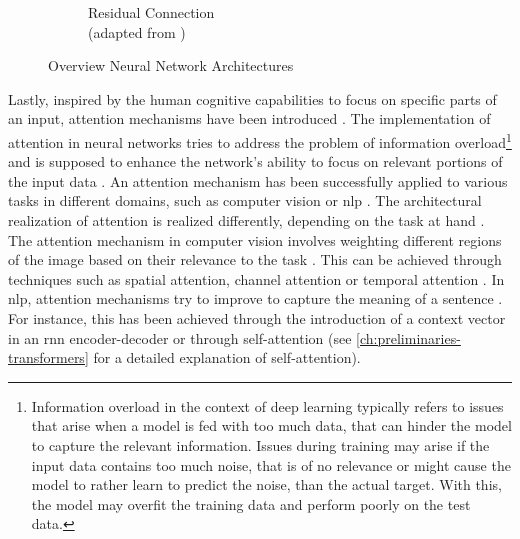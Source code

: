 \begin{figure}
\begin{subfigure}{0.7\textwidth}
        \captionsetup{justification=centering}
        \caption{Residual Connection \\(adapted from \cite{hassan2019ResNet3450})} \label{fig:resnet}
      \end{subfigure}%
    \hspace*{\fill}   %
  \caption[Overview Neural Network Architectures]{Overview Neural Network Architectures} \label{fig:NN_architectures_Overview}
\end{figure}

Lastly, inspired by the human cognitive capabilities to focus on specific parts of an input, attention mechanisms have been introduced \cite{niu2021ReviewAttentionMechanism, aggarwal2018NeuralNetworksDeep}.
The implementation of attention in neural networks tries to address the problem of information overload\footnote{Information overload in the context of deep learning typically refers to issues that arise when a model is fed with too much data, that can hinder the model to capture the relevant information.
Issues during training may arise if the input data contains too much noise, that is of no relevance or might cause the model to rather learn to predict the noise, than the actual target.
With this, the model may overfit the training data and perform poorly on the test data. } and is supposed to enhance the network's ability to focus on relevant portions of the input data \cite{niu2021ReviewAttentionMechanism}.
An attention mechanism has been successfully applied to various tasks in different domains, such as computer vision or \gls{nlp} \cite{niu2021ReviewAttentionMechanism}.
The architectural realization of attention is realized differently, depending on the task at hand \cite{aggarwal2018NeuralNetworksDeep}.
The attention mechanism in computer vision involves weighting different regions of the image based on their relevance to the task \cite{aggarwal2018NeuralNetworksDeep}. 
This can be achieved through techniques such as spatial attention, channel attention or temporal attention \cite{guo2022AttentionMechanismsComputer}.
In \gls{nlp}, attention mechanisms try to improve to capture the meaning of a sentence \cite{niu2021ReviewAttentionMechanism}. 
For instance, this has been achieved through the introduction of a context vector in an \gls{rnn} encoder-decoder \cite{DBLP:journals/corr/BahdanauCB14} or through self-attention \cite{vaswani2017AttentionAllYou} (see \autoref{ch:preliminaries-transformers} for a detailed explanation of self-attention).

